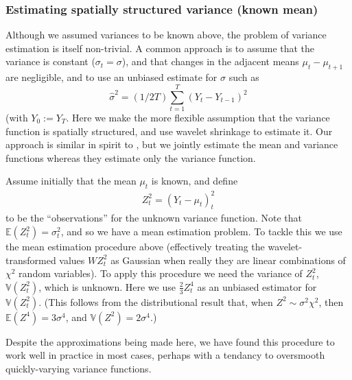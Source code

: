 \documentclass[12pt]{article}
\newcommand{\s}{\sigma}
\begin{document}
\subsubsection{Estimating spatially structured variance (known mean)}

Although we assumed variances to be known above, the problem of variance estimation is itself non-trivial. 
A common approach is to assume that the variance is constant ($\sigma_t=\sigma$), and that changes in the adjacent means $\mu_t-\mu_{t+1}$ are negligible, and to use an unbiased estimate for $\sigma$ such as
\begin{equation} \label{eq:constvar}
\hat{\sigma}^2 = (1/2T) \sum_{t=1}^{T} (Y_t-Y_{t-1})^2
\end{equation}
(with $Y_0:=Y_T$.
Here we make the more flexible assumption that the variance function is spatially structured, and use wavelet shrinkage to estimate it. Our approach is similar in spirit to \cite{cai.wang}, but we jointly estimate the mean and variance functions whereas they estimate only the variance function.

Assume initially that the mean $\mu_t$ is known, and define
\begin{eqnarray}\label{eq:varobs1}
Z_t^2=(Y_t-\mu_t)^2_t
\end{eqnarray}
to be the ``observations'' for the unknown variance function. Note that $\mathbb{E}(Z_t^2)=\s_t^2$, and so
we have a mean estimation problem. To tackle this we use the mean estimation procedure above (effectively treating the wavelet-transformed values $WZ_t^2$ as Gaussian when really they are linear combinations of $\chi^2$ random variables). To apply this procedure we need the variance
of $Z_t^2$, $\mathbb{V}(Z_t^2)$, which is unknown.
Here we use $\frac{2}{3}Z_t^4$ as an 
unbiased estimator for $\mathbb{V}(Z_t^2)$. (This follows from the distributional result that, when $Z^2 \sim \s^2 \chi^2$, then $\mathbb{E}(Z^4)= 3\s^4$, and $\mathbb{V}(Z^2)=2\s^4$.)

Despite the approximations being made here, we have found this procedure to work well in practice in most cases,
perhaps with a tendancy to oversmooth quickly-varying variance functions. 
\end{document}

